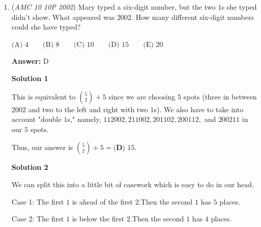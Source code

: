 \begin{enumerate}
 Thus, our answer is $\boxed{\textbf{(B) }177}$




\textbf{Solution 2}

We can directly add everything up since $1 + 2 + \; \dots \; + 10$ is so little.

 Similar to the first solution, let the first integer equal $a.$ The last integer in this string will be $a+10.$

 \begin{align*}a + (a + 1) + (a + 2) + \; \dots \; + (a + 10) &= 2002 \\11a + (1 + 2 + \; \dots \; + 10) &= 2002 \\11a + 55 &= 2002 \\11a &= 1947 \\a &= \frac{1947}{11} \\a &= 177 \\\end{align*}


 Thus, our answer is $\boxed{\textbf{(B) }177}$



	\item (\textit{AMC 10 10P 2002}) Mary typed a six-digit number, but the two $1$s she typed didn't show. What appeared was $2002.$ How many different six-digit numbers could she have typed?


 $\text{(A) }4 \qquad \text{(B) }8 \qquad \text{(C) }10 \qquad \text{(D) }15 \qquad \text{(E) }20$

 \textbf{Answer: }D



\textbf{Solution 1}

This is equivalent to ${5 \choose 2} + 5$ since we are choosing $5$ spots (three in between $2002$ and two to the left and right with two $1$s). We also have to take into account "double $1$s," namely, $112002,  211002,  201102,  200112,$ and $200211$ in our $5$ spots.

 Thus, our answer is ${5 \choose 2} + 5 = \boxed{\textbf{(D) } 15}.$




\textbf{Solution 2}

We can split this into a little bit of casework which is easy to do in our head.

 Case 1: The first $1$ is ahead of the first $2.$Then the second $1$ has $5$ places.

 Case 2: The first $1$ is below the first $2.$Then the second $1$ has $4$ places.


\end{enumerate}
